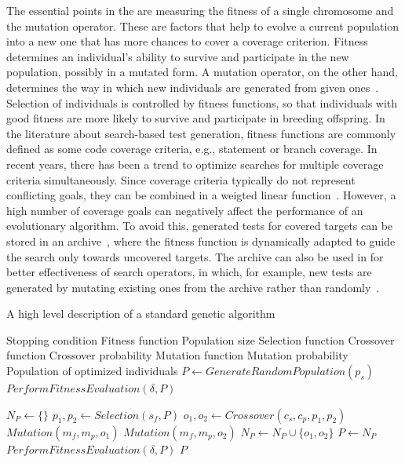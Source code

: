 \documentclass[paper=a4,%
  twoside,%
  BCOR4mm,%
  abstract=true,%
  toc=bibliography,%
  chapterprefix=true,%
  toc=bibliographynumbered,%
  open=right,%
  english,%
  pagesize=pdftex]{scrreprt}
\newcommand{\Desc}[2]{\State \makebox[2em][l]{#1}#2}
\begin{document}
The essential points in the  are measuring the fitness of a single chromosome and the mutation operator. These are factors that help to evolve a current population into a new one that has more chances to cover a coverage criterion. Fitness determines an individual's ability to survive and participate in the new population, possibly in a mutated form. A mutation operator, on the other hand, determines the way in which new individuals are generated from given ones~\cite{Tonella2004}. Selection of individuals is controlled by fitness functions, so that individuals with good fitness are more likely to survive and participate in breeding offspring. In the literature about search-based test generation, fitness functions are commonly defined as some code coverage criteria, e.g., statement or branch coverage. In recent years, there has been a trend to optimize searches for multiple coverage criteria simultaneously. Since coverage criteria typically do not represent conflicting goals, they can be combined in a weigted linear function~\cite{Rojas2015}. However, a high number of coverage goals can negatively affect the performance of an evolutionary algorithm. To avoid this, generated tests for covered targets can be stored in an archive~\cite{Rojas2017}, where the fitness function is dynamically adapted to guide the search only towards uncovered targets. The archive can also be used in for better effectiveness of search operators, in which, for example, new tests are generated by mutating existing ones from the archive rather than randomly~\cite{Campos2017}.

\begin{algorithm}
\caption{A high level description of a standard genetic algorithm~\cite{Campos2017}}\label{alg:genetic-algorithm}
\begin{algorithmic}
\Input
  \Desc{$C$}{Stopping condition}
  \Desc{$\delta$}{Fitness function}
  \Desc{$p_s$}{Population size}
  \Desc{$s_f$}{Selection function}
  \Desc{$c_f$}{Crossover function}
  \Desc{$c_p$}{Crossover probability}
  \Desc{$m_f$}{Mutation function}
  \Desc{$m_p$}{Mutation probability}
  \EndInput
  \Output
  \Desc{$P$}{Population of optimized individuals}
  \EndOutput
\State $P \gets GenerateRandomPopulation(p_s)$
\State $PerformFitnessEvaluation(\delta, P)$

    \State $N_P \gets \{\}$
        \State $p_1, p_2 \gets Selection(s_f, P)$
        \State $o_1, o_2 \gets Crossover(c_s, c_p, p_1, p_2)$
        \State $Mutation(m_f, m_p, o_1)$
        \State $Mutation(m_f, m_p, o_2)$
        \State $N_P \gets N_P \cup \{o_1, o_2\}$
    \EndWhile
    \State $P \gets N_P$
    \State $PerformFitnessEvaluation(\delta, P)$
\EndWhile
\State \Return $P$
\end{algorithmic}
\end{algorithm}
\end{document}
